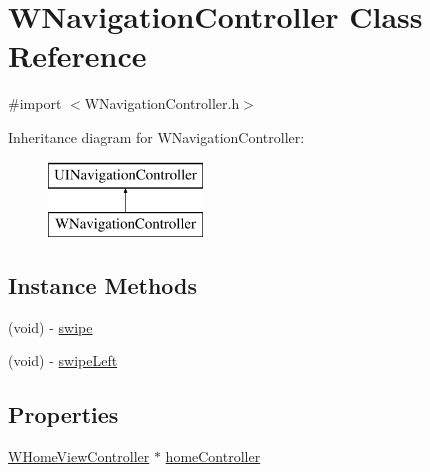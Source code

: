 \hypertarget{interface_w_navigation_controller}{\section{W\-Navigation\-Controller Class Reference}
\label{interface_w_navigation_controller}
}


{\ttfamily \#import $<$W\-Navigation\-Controller.\-h$>$}

Inheritance diagram for W\-Navigation\-Controller\-:\begin{figure}[H]
\begin{center}
\leavevmode
\includegraphics[height=2.000000cm]{interface_w_navigation_controller}
\end{center}
\end{figure}
\subsection*{Instance Methods}
\begin{DoxyCompactItemize}
\item 
(void) -\/ \hyperlink{interface_w_navigation_controller_a9316530a4ab4d259922d5158e3a3906e}{swipe}
\item 
(void) -\/ \hyperlink{interface_w_navigation_controller_ad510fe4870b1ab502c1495342d027719}{swipe\-Left}
\end{DoxyCompactItemize}
\subsection*{Properties}
\begin{DoxyCompactItemize}
\item 
\hyperlink{interface_w_home_view_controller}{W\-Home\-View\-Controller} $\ast$ \hyperlink{interface_w_navigation_controller_a9a9ad281493925cfa76683d4df4620a1}{home\-Controller}
\end{DoxyCompactItemize}


